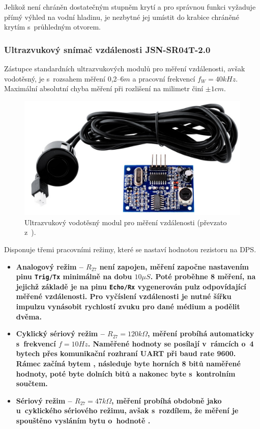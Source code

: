                 Jelikož  není chráněn dostatečným stupněm krytí a pro správnou funkci vyžaduje přímý výhled na vodní hladinu, je nezbytné jej umístit do krabice chráněné krytím  s~průhledným otvorem.
                
            \subsubsection{Ultrazvukový snímač vzdálenosti JSN-SR04T-2.0}

                Zástupce standardních ultrazvukových modulů pro měření vzdálenosti, avšak vodotěsný, je  s~rozsahem měření 0,2--$6\unit{m}$ a pracovní frekvencí $f_W = 40\unit{kHz}$. Maximální absolutní chyba měření při rozlišení na milimetr činí $\pm 1\unit{cm}$.~\cite{sensor:jsn}

                \begin{figure}[h]
                    \centering
                    \includegraphics[width=0.6\linewidth]{obrazky-figures/jsn.pdf}
                    \caption{Ultrazvukový vodotěsný modul pro měření vzdálenosti (převzato z~\cite{shop:jsn}).}
                    \label{img:jsn}
                \end{figure}

                Disponuje třemi pracovními režimy, které se nastaví hodnotou rezistoru  na DPS.
                \begin{itemize}
                    \item \bf Analogový režim \rm -- $R_{27}$ není zapojen, měření započne nastavením pinu \texttt{Trig/Tx} minimálně na dobu $10\unit{\mu S}$. Poté proběhne 8 měření, na jejichž základě je na pinu \texttt{Echo/Rx} vygenerován pulz odpovídající měřené vzdálenosti. Pro vyčíslení vzdálenosti je nutné šířku impulzu vynásobit rychlostí zvuku pro dané médium a podělit dvěma.
                    \item \bf Cyklický sériový režim \rm -- $R_{27} = 120\unit{k\Omega}$, měření probíhá automaticky s~frekvencí $f=10\unit{Hz}$. Naměřené hodnoty se posílají v~rámcích o~4 bytech přes komunikační rozhraní UART při baud rate 9600. Rámec začíná bytem , následuje byte horních 8 bitů naměřené hodnoty, poté byte dolních bitů a nakonec byte s~kontrolním součtem.
                    \item \bf Sériový režim \rm -- $R_{27} = 47\unit{k\Omega}$, měření probíhá obdobně jako u~cyklického sériového režimu, avšak s~rozdílem, že měření je spouštěno vysláním bytu o~hodnotě .
                \end{itemize}                

